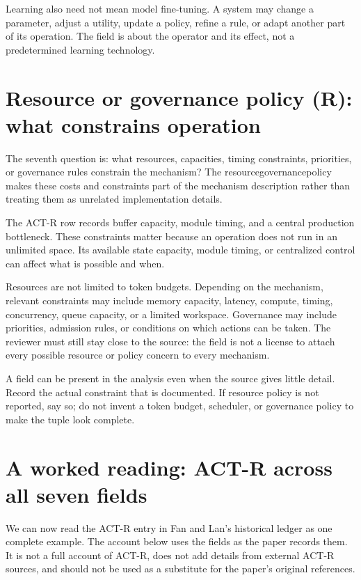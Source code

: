 Learning also need not mean model fine-tuning. A system may change a parameter, adjust a utility, update a policy, refine a rule, or adapt another part of its operation. The field is about the operator and its effect, not a predetermined learning technology.

\section{Resource or governance policy (R): what constrains operation}
\label{sec:field-resources}

The seventh question is: what resources, capacities, timing constraints, priorities, or governance rules constrain the mechanism? The \gls{resourcegovernancepolicy} makes these costs and constraints part of the mechanism description rather than treating them as unrelated implementation details.

The ACT-R row records buffer capacity, module timing, and a central production bottleneck. These constraints matter because an operation does not run in an unlimited space. Its available state capacity, module timing, or centralized control can affect what is possible and when.

Resources are not limited to token budgets. Depending on the mechanism, relevant constraints may include memory capacity, latency, compute, timing, concurrency, queue capacity, or a limited workspace. Governance may include priorities, admission rules, or conditions on which actions can be taken. The reviewer must still stay close to the source: the field is not a license to attach every possible resource or policy concern to every mechanism.

\begin{notebox}
A field can be present in the analysis even when the source gives little detail. Record the actual constraint that is documented. If resource policy is not reported, say so; do not invent a token budget, scheduler, or governance policy to make the tuple look complete.
\end{notebox}

\section{A worked reading: ACT-R across all seven fields}
\label{sec:actr-worked-reading}

We can now read the ACT-R entry in Fan and Lan's historical ledger as one complete example. The account below uses the fields as the paper records them. It is not a full account of ACT-R, does not add details from external ACT-R sources, and should not be used as a substitute for the paper's original references.

